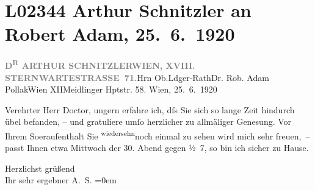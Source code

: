 

\section[Arthur Schnitzler an Robert Adam, 25. 6. 1920]{L02344 Arthur Schnitzler an Robert Adam, 25. 6. 1920}
\nopagebreak{}
\rehead{ }\normalsize\beginnumbering{}
\toendnotes[C]{\smallbreak\pagebreak[2]}
\pstart{}{\pb}\textcolor{gray}{\textbf{D\textsuperscript{R} ARTHUR SCHNITZLER}}\pend{}\pstart{}\textcolor{gray}{\textbf{WIEN, XVIII. STERNWARTESTRASSE 71.}}\pend{}{\bigskip}\pstart{}Hrn Ob.Ldger-Rath\pend{}\pstart{}Dr. Rob. Adam Pollak\pend{}\pstart{}Wien XII\pend{}\pstart{}Meidlinger Hptstr. 58.\pend{}{\bigskip}\vspace{1em}
\pstart
           \raggedleft{}{\pb}Wien, 25. 6. 1920\pend
           
\pstart{}Verehrter Herr Doctor,\pend\vspace{0.5em}
\pstart
           ungern erfahre ich, dſs Sie sich so lange Zeit hindurch übel befanden, – und
               gratuliere umſo herzlicher zu allmäliger Genesung. Vor Ihrem So{\geminationm}eraufenthalt Sie \substVorne{}\textsuperscript{wiedersehn}\substDazwischen{}noch einmal\substHinten{} zu sehen wird mich sehr freuen, – passt Ihnen etwa Mittwoch der
                  30.{ }Abend gegen ½ 7, so bin ich sicher zu Hause.\pend
           
\pstart
           Herzlichst grüßend{\\[\baselineskip]}Ihr sehr ergebner \spacefill\mbox{A. S.}\pend
           \leftskip=0em{}\endnumbering{}  
      